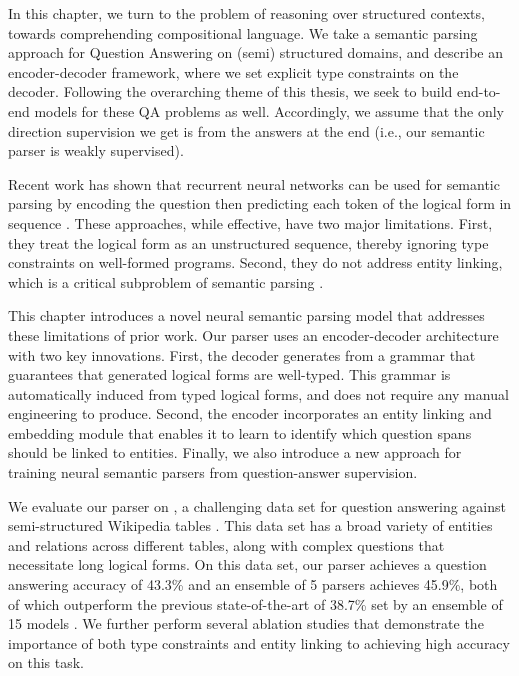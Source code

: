 In this chapter, we turn to the problem of reasoning over structured contexts, 
towards comprehending compositional language. We take a semantic parsing 
approach for Question Answering on (semi) structured
domains, and describe an encoder-decoder framework, where we set explicit type 
constraints on the decoder. Following the overarching theme of this thesis, we 
seek to build end-to-end models for these QA problems
as well. Accordingly, we assume that the only direction supervision we get is 
from the answers at the end (i.e., our semantic parser is weakly supervised).

Recent work has shown that recurrent neural networks can be used for semantic parsing by encoding the question
then predicting each token of the logical form in sequence \cite{jia2016,dong2016}.
These approaches, while effective, have two major limitations.
First, they treat the logical form as an unstructured sequence, thereby ignoring type constraints on well-formed programs.
Second, they do not address entity linking, which is a critical subproblem of semantic parsing \cite{yih2015stagg}.

This chapter introduces a novel neural semantic parsing model that addresses these limitations of prior work.
Our parser uses an encoder-decoder architecture with two key innovations.
First, the decoder generates from a grammar that guarantees that generated logical forms are well-typed.
This grammar is automatically induced from typed logical forms, and does not require any manual engineering to produce. 
Second, the encoder incorporates an entity linking and embedding module that enables it to learn to identify which question spans should be linked to entities.
Finally, we also introduce a new approach for training neural semantic parsers from question-answer supervision.

We evaluate our parser on \wikitables{}, a challenging data set for question answering against semi-structured Wikipedia tables \cite{pasupat2015}.
This data set has a broad variety of entities and relations across different tables, along with complex questions that necessitate long logical forms.
On this data set, our parser achieves a question answering accuracy of 43.3\% and an ensemble of 5 parsers achieves 45.9\%, both of which outperform the
previous state-of-the-art of 38.7\% set by an ensemble of 15 models \cite{haug2017}. We further perform several ablation studies that demonstrate the
importance of both type constraints and entity linking to achieving high accuracy on this task.

